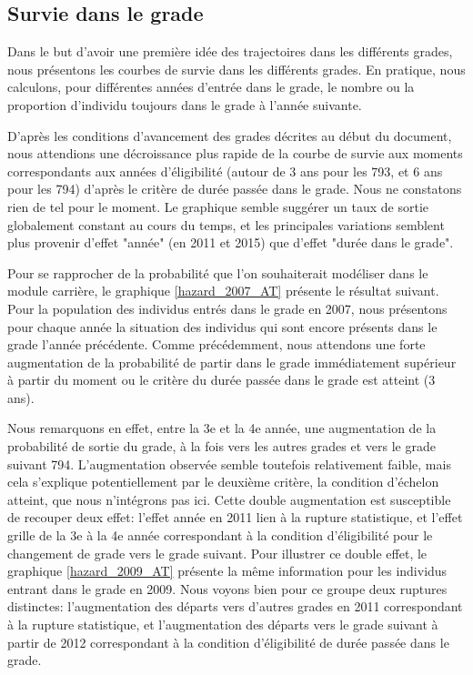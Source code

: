 \documentclass[11pt,a4paper]{article}
\begin{document}
\subsection{Survie dans le grade}


Dans le but d'avoir une première idée des trajectoires dans les différents grades, nous présentons les courbes de survie dans les différents grades. En pratique, nous calculons, pour différentes années d'entrée dans le grade, le nombre ou la proportion d'individu toujours dans le grade à l'année suivante. 

D'après les conditions d'avancement des grades décrites au début du document, nous attendions une décroissance plus rapide de la courbe de survie aux moments correspondants aux années d'éligibilité (autour de 3 ans pour les 793, et 6 ans pour les 794) d'après le critère de durée passée dans le grade. Nous ne constatons rien de tel pour le moment. Le graphique semble suggérer un taux de sortie globalement constant au cours du temps, et les principales variations semblent plus provenir d'effet "année" (en 2011 et 2015) que d'effet "durée dans le grade". 

\medskip

Pour se rapprocher de la probabilité que l'on souhaiterait modéliser dans le module carrière, le graphique \ref{hazard_2007_AT} présente le résultat suivant. Pour la population des individus entrés dans le grade en 2007, nous présentons pour chaque année la situation des individus qui sont encore présents dans le grade l'année précédente. Comme précédemment, nous attendons une forte augmentation de la probabilité de partir dans le grade immédiatement supérieur à partir du moment ou le critère du durée passée dans le grade est atteint (3 ans). 

Nous remarquons en effet, entre la 3e et la 4e année, une augmentation de la probabilité de sortie du grade, à la fois vers les autres grades et vers le grade suivant 794. L'augmentation observée semble toutefois relativement faible, mais cela s'explique potentiellement par le deuxième critère, la condition d'échelon atteint, que nous n'intégrons pas ici. Cette double augmentation est susceptible de recouper deux effet: l'effet année en 2011 lien à la rupture statistique, et l'effet grille de la 3e à la 4e année correspondant à la condition d'éligibilité pour le changement de grade vers le grade suivant. Pour illustrer ce double effet, le graphique \ref{hazard_2009_AT} présente la même information pour les individus entrant dans le grade en 2009. Nous voyons bien pour ce groupe deux ruptures distinctes: l'augmentation des départs vers d'autres grades en 2011 correspondant à la rupture statistique, et l'augmentation des départs vers le grade suivant à partir de 2012 correspondant à la condition d'éligibilité de durée passée dans le grade. 
\end{document}
